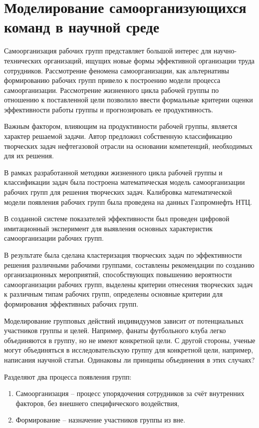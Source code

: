 \section{Моделирование самоорганизующихся команд в научной среде}

Самоорганизация рабочих групп представляет большой интерес для научно-технических организаций, ищущих новые формы эффективной организации труда сотрудников.
Рассмотрение феномена самоорганизации, как альтернативы формированию рабочих групп привело к построению модели процесса самоорганизации. 
Рассмотрение жизненного цикла рабочей группы по отношению к поставленной цели позволило ввести формальные критерии оценки эффективности работы группы и прогнозировать ее продуктивность.

Важным фактором, влияющим на продуктивности рабочей группы, является характер решаемой задачи. 
Автор предложил собственную классификацию творческих задач нефтегазовой отрасли на основании компетенций, необходимых для их решения. 

В рамках разработанной методики жизненного цикла рабочей группы и классификации задач была построена математическая модель самоорганизации рабочих групп для решения творческих задач. Калибровка математической модели появления рабочих групп была проведена на данных Газпромнефть НТЦ. 

В созданной системе показателей эффективности был проведен цифровой имитационный эксперимент для выявления основных характеристик самоорганизации рабочих групп.

В результате была сделана кластеризация творческих задач по эффективности решения различными рабочими группами, составлены рекомендации по созданию организационных мероприятий, способствующих повышению вероятности самоорганизации рабочих групп, выделены критерии отнесения творческих задач к различным типам рабочих групп, определены основные критерии для формирования эффективных рабочих групп.

Моделирование групповых действий индивидуумов зависит от потенциальных участников группы и целей. 
Например, фанаты футбольного клуба легко объединяются в группу, но не имеют конкретной цели. 
С другой стороны, ученые могут объединяться в исследовательскую группу для конкретной цели, например, написания научной статьи. 
Одинаковы ли принципы объединения в этих случаях? 

Разделяют два процесса появления групп:
\begin{enumerate}
\item Самоорганизация – процесс упорядочения сотрудников за счёт внутренних факторов, без внешнего специфического воздействия, 
\item Формирование – назначение участников группы из вне.
\end{enumerate}

